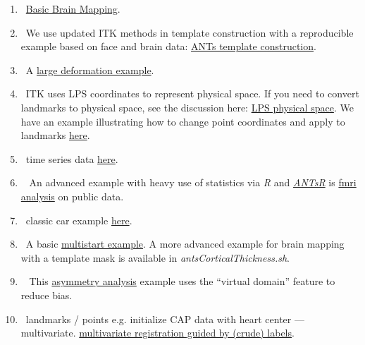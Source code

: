 \documentclass{frontiersSCNS}
\begin{document}
\begin{enumerate}

  \item~\href{https://github.com/stnava/BasicBrainMapping}{Basic Brain Mapping}.

  \item~We use updated ITK methods in template construction with a
    reproducible example based on face and brain data:
    \href{https://github.com/ntustison/TemplateBuildingExample}{ANTs
      template construction}.  %

  \item~A \href{http://stnava.github.io/C/}{large deformation
      example}. %

  \item~ITK uses LPS coordinates to represent physical space.  If you
    need to convert landmarks to physical space, see the discussion here:
    \href{http://sourceforge.net/p/advants/discussion/840261/thread/2a1e9307/}{LPS
      physical
      space}.  We have an example illustrating how to change point
    coordinates and apply to landmarks
    \href{http://stnava.github.io/chicken/}{here}. %

  \item~time series data
    \href{https://github.com/stnava/ANTs/blob/master/Scripts/antsMotionCorrExample}{here}. %

   \item~ An advanced example with heavy use of statistics via {\em
       R} and \href{http://stnava.github.io/ANTsR/}{{\em ANTsR}} is
       \href{http://stnava.github.io/RfMRI/}{fmri analysis} on public data. %

  \item~classic car example \href{http://stnava.github.io/cars/}{here}. %

  \item~A basic \href{http://stnava.github.io/butterfly/}{multistart example}.  A more advanced
    example for brain mapping with a template mask is available in
    {\em antsCorticalThickness.sh}. %

   \item~  This \href{http://stnava.github.io/asymmetry/}{asymmetry
       analysis} example uses the ``virtual domain'' feature to reduce
     bias.  %

  \item~landmarks / points e.g. initialize CAP data with heart center
    ---
    multivariate. \href{http://stnava.github.io/LabelMyHeart/}{multivariate
    registration guided by (crude) labels}.


\end{enumerate}
\end{document}
